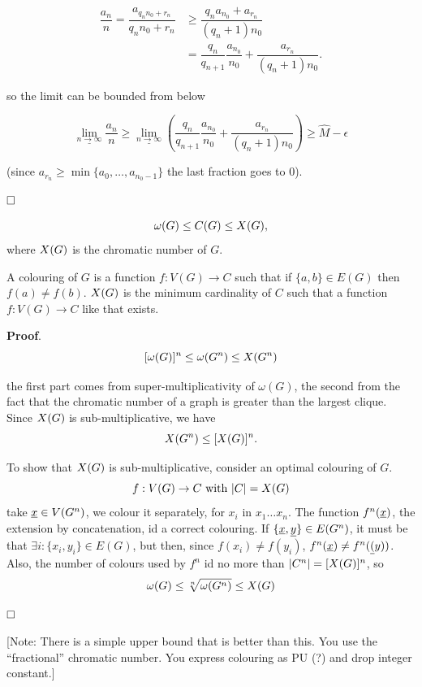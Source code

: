 \begin{align*}
 \dfrac{a_n}{n} = \dfrac{a_{q_nn_0 +r_n}}{q_nn_0 +r_n} & \geq \dfrac{q_na_{n_0} +a_{r_n}}{(q_n+1)n_0}\\
 & = \dfrac{q_n}{q_{n+1}} \dfrac{a_{n_0}}{n_0} + \dfrac{a_{r_n}}{(q_n + 1)n_0}.
\end{align*}

so the limit can be bounded from below

\[
 \underline{\lim_{n\rightarrow \infty}} \dfrac{a_n}{n} \geq \underline{\lim_{n\rightarrow \infty}}\left(\dfrac{q_n}{q_{n+1}} \dfrac{a_{n_0}}{n_0} + \dfrac{a_{r_n}}{(q_n + 1)n_0}\right) \geq \hat{M} - \epsilon
\]

(since $a_{r_n} \geq \min\{a_0, \ldots,a_{n_0 -1}\}$ the last fraction goes to 0).

$\hfill\Box$

\begin{prop}
 $$\omega(G) \leq C(G) \leq X(G),$$ where $X(G)$ is the chromatic number of $G$.
\end{prop}

A colouring of $G$ is a function $f: V(G) \rightarrow C$ such that if $\{a, b\} \in E(G)$ then $f(a) \not= f(b)$. $X(G)$ is the minimum cardinality of $C$ such that a function $f: V(G) \rightarrow C$ like that exists.

\noindent\textbf{Proof}. 
\[
 [\omega(G)]^n \leq \omega(G^n) \leq X(G^n)
\]

the first part comes from super-multiplicativity of $\omega(G)$, the second from the fact that the chromatic number of a graph is greater than the largest clique. Since $X(G)$ is sub-multiplicative, we have $$X(G^n) \leq [X(G)]^n.$$

To show that $X(G)$ is sub-multiplicative, consider an optimal colouring of $G$. $$f:V(G) \rightarrow C\ \text{with}\ |C| = X(G)$$ take $\underline{x} \in V(G^n)$, we colour it separately, for $x_i$ in $x_1\ldots x_n$. The function $f^n(\underline{x})$, the extension by concatenation, id a correct colouring. If $\{\underline{x}, \underline{y}\} \in E(G^n)$, it must be that $\exists i : \{x_i, y_i\} \in E(G)$, but then, since $f(x_i) \not=f(y_i)$, $f^n(\underline{x}) \not= f^n(\underline{(}y))$. Also, the number of colours used by $f^n$ id no more than $|C^n| = [X(G)]^n$, so
\[
 \omega(G) \leq \sqrt[n]{\omega(G^n)} \leq X(G)
\]

$\hfill\Box$

[Note: There is a simple upper bound that is better than this. You use the ``fractional'' chromatic number. You express colouring as PU (?) and drop integer constant.]

